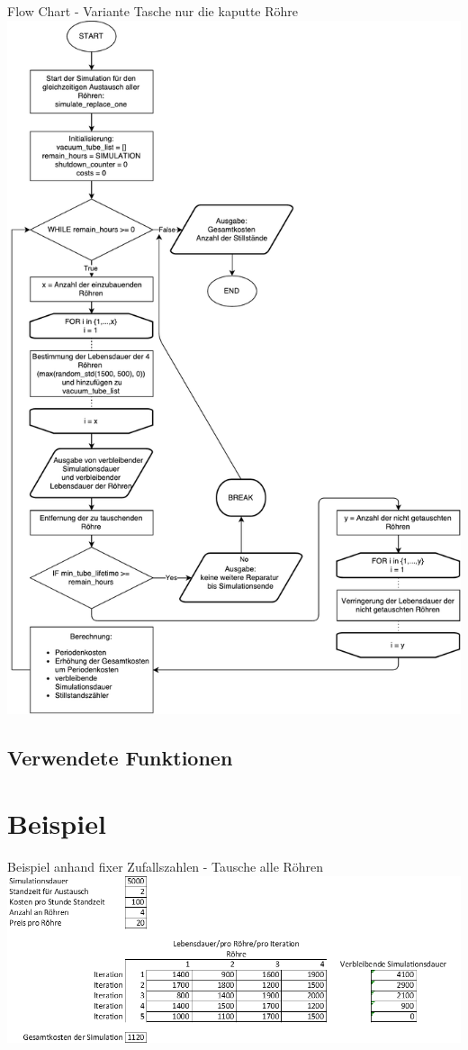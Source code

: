 \begin{frame}{Flow Chart - Variante Tasche nur die kaputte Röhre}
	\centering
  	\includegraphics[scale=0.15]{BSP20_Flow_Chart_one.pdf}
\end{frame}

\subsection{Verwendete Funktionen}
%
%


\section{Beispiel}
\begin{frame}[fragile]{Beispiel anhand fixer Zufallszahlen - Tausche alle Röhren}
	\centering
  	\includegraphics[scale=.5]{BSP20_Zufallszahlen_1.png}
\end{frame}

